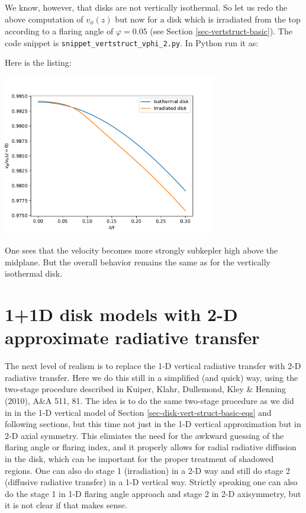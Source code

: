 \documentclass{book}
\newcommand{\code}[1]{{\small\tt #1}}
\begin{document}
We know, however, that disks are not vertically isothermal. So let us redo the
above computation of $v_\phi(z)$ but now for a disk which is irradiated from the
top according to a flaring angle of $\varphi = 0.05$ (see Section
\ref{sec-vertstruct-basic}).
The code snippet is
\code{snippet\_vertstruct\_vphi\_2.py}. In Python run it as:
\begin{codebox}
\end{codebox}
Here is the listing:

\centerline{\includegraphics[width=0.7\textwidth]{../snippets/fig_snippet_vertstruct_vphi_2_1.pdf}}
One sees that the velocity becomes more strongly subkepler high above the
midplane. But the overall behavior remains the same as for the vertically
isothermal disk.

\section{1+1D disk models with 2-D approximate radiative transfer}
\label{sec-fld-rt-model}
%
The next level of realism is to replace the 1-D vertical radiative transfer with
2-D radiative transfer. Here we do this still in a simplified (and quick) way,
using the two-stage procedure described in Kuiper, Klahr, Dullemond, Kley \&
Henning (2010), A\&A 511, 81. The idea is to do the same two-stage procedure as
we did in in the 1-D vertical model of Section
\ref{sec-disk-vert-struct-basic-eqs} and following sections, but this time not
just in the 1-D vertical approximation but in 2-D axial symmetry. This elimiates
the need for the awkward guessing of the flaring angle or flaring index, and it
properly allows for radial radiative diffusion in the disk, which can be important
for the proper treatment of shadowed regions. One can also do stage 1 (irradiation)
in a 2-D way and still do stage 2 (diffusive radiative transfer) in a 1-D vertical
way. Strictly speaking one can also do the stage 1 in 1-D flaring angle approach
and stage 2 in 2-D axisymmetry, but it is not clear if that makes sense.
\end{document}
